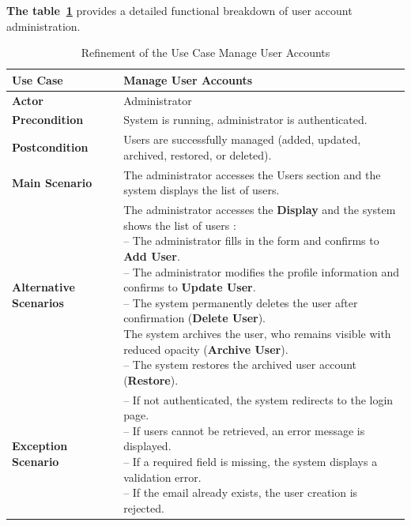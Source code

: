 \textbf{The table~\ref{tab:ref_manage_users}} provides a detailed functional breakdown of user account administration.
\begin{table}[H]
\centering
\caption{Refinement of the Use Case Manage User Accounts}
\label{tab:ref_manage_users}
\begin{tabular}{|>{\centering\arraybackslash}p{4cm}|p{10cm}|}
\hline
\textbf{Use Case} & Manage User Accounts \\ \hline
\textbf{Actor} & Administrator \\ \hline
\textbf{Precondition} & System is running, administrator is authenticated. \\ \hline
\textbf{Postcondition} & Users are successfully managed (added, updated, archived, restored, or deleted). \\ \hline
\textbf{Main Scenario} & The administrator accesses the Users section and the system displays the list of users. \\ \hline
\textbf{Alternative Scenarios} &
\parbox[t]{10cm}{\small\setlength{\parskip}{1pt}
The administrator accesses the \textbf{Display} and the system shows the list of users :\newline
\hspace*{0.2cm}-- The administrator fills in the form and confirms to \textbf{Add User}.\newline
\hspace*{0.2cm}-- The administrator modifies the profile information and confirms to \textbf{Update User}.\newline
\hspace*{0.2cm}-- The system permanently deletes the user after confirmation (\textbf{Delete User}).\newline
The system archives the user, who remains visible with reduced opacity (\textbf{Archive User}).\newline
\hspace*{0.4cm}-- The system restores the archived user account (\textbf{Restore}).
}\\ \hline
\textbf{Exception Scenario} &
\parbox[t]{10cm}{\small\setlength{\parskip}{1pt}
-- If not authenticated, the system redirects to the login page.\newline
-- If users cannot be retrieved, an error message is displayed.\newline
-- If a required field is missing, the system displays a validation error.\newline
-- If the email already exists, the user creation is rejected.
}\\ \hline
\end{tabular}
\end{table}


